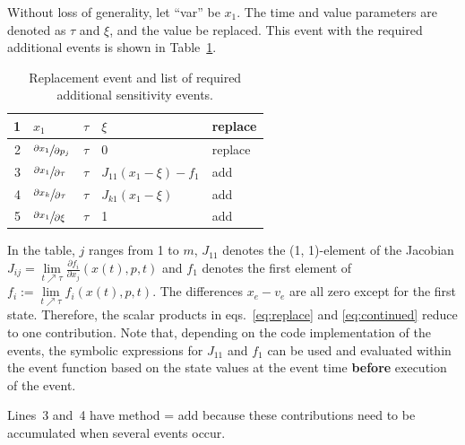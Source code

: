 \documentclass[journal, a4paper]{IEEEtran}
\begin{document}
Without loss of generality, let ``var'' be $x_1$. The time and value parameters are denoted as $\tau$ and $\xi$, and the value be replaced. This event with the required additional events is shown in Table~\ref{tab:replacement}.
\begin{table}[ht]
\caption{Replacement event and list of required additional sensitivity events.}
\label{tab:replacement}
\begin{center}
\begin{tabular}{|r|l|l|l|l|}\hline
     1 & $x_1$ & $\tau$ & $\xi$ & replace \\
     \hline
     2 & $\sfrac{\partial x_1}{\partial p_j}$ & $\tau$ & $0$ & replace \\
     3 & $\sfrac{\partial x_1}{\partial \tau}$ & $\tau$ & $J_{11}(x_1-\xi)-f_1$ & add \\
     4 & $\sfrac{\partial x_k}{\partial \tau}$ & $\tau$ & $J_{k1}(x_1-\xi)$ & add \\
     5 &$\sfrac{\partial x_1}{\partial \xi}$ & $\tau$ & 1 & add \\
     \hline
\end{tabular}
\end{center}
\end{table}
In the table, $j$ ranges from 1 to $m$, $J_{11}$ denotes the (1, 1)-element of the Jacobian $J_{ij} = \lim\limits_{t \nearrow \tau}\frac{\partial f_i}{\partial x_j}(x(t), p, t)$ and $f_1$ denotes the first element of $f_i := \lim\limits_{t \nearrow \tau}f_i(x(t), p, t)$.
The differences $x_e - v_e$ are all zero except for the first state. Therefore, the scalar products in eqs.~\eqref{eq:replace} and \eqref{eq:continued} reduce to one contribution.
Note that, depending on the code implementation of the events, the symbolic expressions for $J_{11}$ and $f_1$ can be used and evaluated within the event function based on the state values at the event time \textbf{before} execution of the event.

Lines~3 and~4 have method = add because these contributions need to be accumulated when several events occur.

\end{document}
